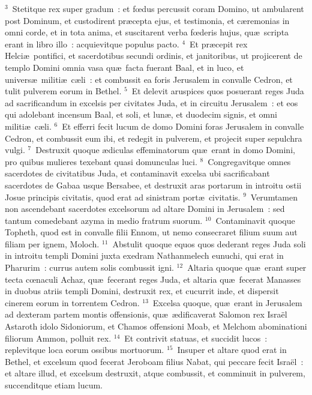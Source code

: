 ${}^{3}$~Stetitque rex super gradum~: et fœdus percussit coram Domino, ut ambularent post Dominum, et custodirent pr\ae cepta ejus, et testimonia, et c\ae remonias in omni corde, et in tota anima, et suscitarent verba fœderis hujus, qu\ae\ scripta erant in libro illo~: acquievitque populus pacto.
${}^{4}$~Et pr\ae cepit rex Helci\ae\ pontifici, et sacerdotibus secundi ordinis, et janitoribus, ut projicerent de templo Domini omnia vasa qu\ae\ facta fuerant Baal, et in luco, et univers\ae\ militi\ae\ c\ae li~: et combussit ea foris Jerusalem in convalle Cedron, et tulit pulverem eorum in Bethel.
${}^{5}$~Et delevit aruspices quos posuerant reges Juda ad sacrificandum in excelsis per civitates Juda, et in circuitu Jerusalem~: et eos qui adolebant incensum Baal, et soli, et lun\ae , et duodecim signis, et omni militi\ae\ c\ae li.
${}^{6}$~Et efferri fecit lucum de domo Domini foras Jerusalem in convalle Cedron, et combussit eum ibi, et redegit in pulverem, et projecit super sepulchra vulgi.
${}^{7}$~Destruxit quoque \ae diculas effeminatorum qu\ae\ erant in domo Domini, pro quibus mulieres texebant quasi domunculas luci.
${}^{8}$~Congregavitque omnes sacerdotes de civitatibus Juda, et contaminavit excelsa ubi sacrificabant sacerdotes de Gabaa usque Bersabee, et destruxit aras portarum in introitu ostii Josue principis civitatis, quod erat ad sinistram port\ae\ civitatis.
${}^{9}$~Verumtamen non ascendebant sacerdotes excelsorum ad altare Domini in Jerusalem~: sed tantum comedebant azyma in medio fratrum suorum.
${}^{10}$~Contaminavit quoque Topheth, quod est in convalle filii Ennom, ut nemo consecraret filium suum aut filiam per ignem, Moloch.
${}^{11}$~Abstulit quoque equos quos dederant reges Juda soli in introitu templi Domini juxta exedram Nathanmelech eunuchi, qui erat in Pharurim~: currus autem solis combussit igni.
${}^{12}$~Altaria quoque qu\ae\ erant super tecta cœnaculi Achaz, qu\ae\ fecerant reges Juda, et altaria qu\ae\ fecerat Manasses in duobus atriis templi Domini, destruxit rex, et cucurrit inde, et dispersit cinerem eorum in torrentem Cedron.
${}^{13}$~Excelsa quoque, qu\ae\ erant in Jerusalem ad dexteram partem montis offensionis, qu\ae\ \ae dificaverat Salomon rex Isra\"el Astaroth idolo Sidoniorum, et Chamos offensioni Moab, et Melchom abominationi filiorum Ammon, polluit rex.
${}^{14}$~Et contrivit statuas, et succidit lucos~: replevitque loca eorum ossibus mortuorum.
${}^{15}$~Insuper et altare quod erat in Bethel, et excelsum quod fecerat Jeroboam filius Nabat, qui peccare fecit Isra\"el~: et altare illud, et excelsum destruxit, atque combussit, et comminuit in pulverem, succenditque etiam lucum.
